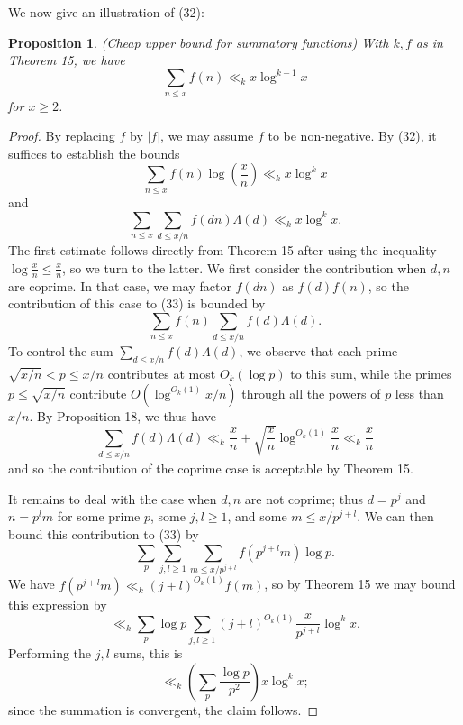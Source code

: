 \documentclass[10pt,reqno]{amsart}
\newtheorem{prop}[theorem]{Proposition}
\begin{document}
We now give an illustration of (32):

\begin{prop}
    (Cheap upper bound for summatory functions) With $k, f$ as in Theorem 15, we have
    \[  \sum_{n \leq x} f(n) \ll_k x \log^{k-1} x\]
    for $x \geq 2$.
\end{prop}
\begin{proof}
    By replacing $f$ by $|f|$, we may assume $f$ to be non-negative. By (32), it suffices to establish the bounds
    \[  \sum_{n \leq x} f(n) \log \left( \frac{x}{n} \right) \ll_k x \log^k x \]
    and
    \begin{equation}   \sum_{n \leq x} \sum_{d \leq x/n} f(dn) \Lambda(d) \ll_k x \log^k x. \end{equation}
    The first estimate follows directly from Theorem 15 after using the inequality $\log \frac{x}{n} \leq \frac{x}{n}$, so we turn to the latter. We first consider the contribution when $d, n$ are coprime. In that case, we may factor $f(dn)$ as $f(d) f(n)$, so the contribution of this case to (33) is bounded by
    \[  \sum_{n \leq x} f(n) \sum_{d \leq x/n} f(d) \Lambda(d).\]
    To control the sum $\sum_{d \leq x/n} f(d) \Lambda(d)$, we observe that each prime $\sqrt{x/n} < p \leq x/n$ contributes at most $O_k( \log p )$ to this sum, while the primes $p \leq \sqrt{x/n}$ contribute $O(\log^{O_k(1)} x/n)$ through all the powers of $p$ less than $x/n$. By Proposition 18, we thus have
    \[  \sum_{d \leq x/n} f(d) \Lambda(d) \ll_k \frac{x}{n} + \sqrt{\frac{x}{n}} \log^{O_k(1)} \frac{x}{n} \ll_k \frac{x}{n} \]
    and so the contribution of the coprime case is acceptable by Theorem 15.

    It remains to deal with the case when $d,n$ are not coprime; thus $d = p^j$ and $n = p^l m$ for some prime $p$, some $j,l \geq 1$, and some $m \leq x/p^{j+l}$. We can then bound this contribution to (33) by
    \[  \sum_p \sum_{j,l \geq 1} \sum_{m \leq x/p^{j+l}} f(p^{j+l} m) \log p.\]
    We have $f(p^{j+l} m) \ll_k (j+l)^{O_k(1)} f(m)$, so by Theorem 15 we may bound this expression by
    \[  \ll_k \sum_p \log p \sum_{j,l \geq 1} (j+l)^{O_k(1)} \frac{x}{p^{j+l}} \log^k x.\]
    Performing the $j,l$ sums, this is
    \[  \ll_k \left(\sum_p \frac{\log p}{p^2} \right) x \log^k x;\]
    since the summation is convergent, the claim follows. %
\end{proof}
\end{document}
